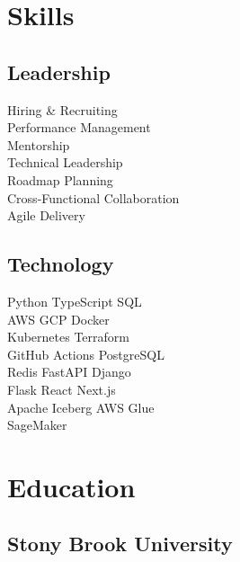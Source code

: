 \documentclass[]{plushcv}
\begin{document}
\begin{minipage}[t]{0.25\textwidth} 


\section{Skills}
\subsection{Leadership}
\sectionsep
Hiring \& Recruiting \textbullet{} \\
Performance Management \textbullet{} \\
Mentorship \textbullet{} \\
Technical Leadership \textbullet{} \\
Roadmap Planning \textbullet{} \\
Cross-Functional Collaboration \textbullet{} \\
Agile Delivery \\
\sectionsep
\sectionsep
\subsection{Technology}
\sectionsep
Python \textbullet{} TypeScript \textbullet{} SQL \textbullet{} \\
AWS \textbullet{} GCP \textbullet{} Docker \textbullet{} \\
Kubernetes \textbullet{} Terraform \textbullet{} \\
GitHub Actions \textbullet{} PostgreSQL \textbullet{} \\
Redis \textbullet{} FastAPI \textbullet{} Django \textbullet{} \\
Flask \textbullet{} React \textbullet{} Next.js \textbullet{} \\
Apache Iceberg \textbullet{} AWS Glue \textbullet{} \\
SageMaker \\

\sectionsep


\section{Education} 
\subsection{Stony Brook University}


\end{minipage}
\end{document}
